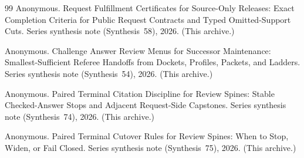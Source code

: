 \documentclass[11pt]{article}
\begin{document}
\begin{thebibliography}{99}
Anonymous.
\newblock Request Fulfillment Certificates for Source-Only Releases: Exact Completion Criteria for Public Request Contracts and Typed Omitted-Support Cuts.
\newblock Series synthesis note (Synthesis~58), 2026. (This archive.)




Anonymous.
\newblock Challenge Answer Review Menus for Successor Maintenance: Smallest-Sufficient Referee Handoffs from Dockets, Profiles, Packets, and Ladders.
\newblock Series synthesis note (Synthesis~54), 2026. (This archive.)

Anonymous.
\newblock Paired Terminal Citation Discipline for Review Spines: Stable Checked-Answer Stops and Adjacent Request-Side Capstones.
\newblock Series synthesis note (Synthesis~74), 2026. (This archive.)

Anonymous.
\newblock Paired Terminal Cutover Rules for Review Spines: When to Stop, Widen, or Fail Closed.
\newblock Series synthesis note (Synthesis~75), 2026. (This archive.)

\end{thebibliography}
\end{document}
